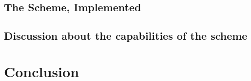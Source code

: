 \documentclass{article}
\theoremstyle{definition}
\theoremstyle{example}
\begin{document}
\subsubsection{}
\subsection{The Scheme, Implemented}
\cite{gentryImplementation}
\cite{smartImplementation}
\subsection{Discussion about the capabilities of the scheme}
\section{Conclusion}
\printbibliography
\end{document}
